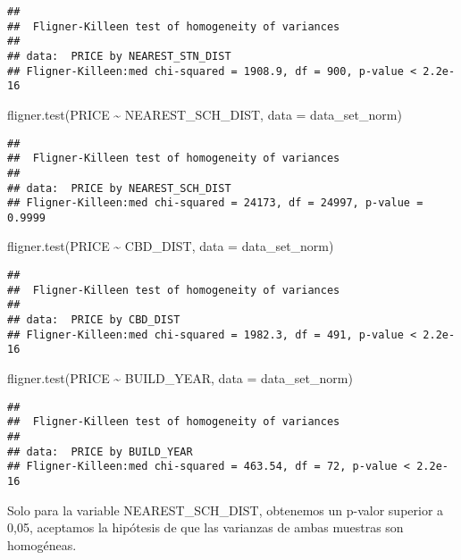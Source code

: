 \documentclass[
]{article}
\newenvironment{Shaded}{\begin{snugshade}}{\end{snugshade}}
\newcommand{\AttributeTok}[1]{\textcolor[rgb]{0.77,0.63,0.00}{#1}}
\newcommand{\FunctionTok}[1]{\textcolor[rgb]{0.00,0.00,0.00}{#1}}
\newcommand{\NormalTok}[1]{#1}
\newcommand{\SpecialCharTok}[1]{\textcolor[rgb]{0.00,0.00,0.00}{#1}}
\begin{document}
\begin{verbatim}
## 
##  Fligner-Killeen test of homogeneity of variances
## 
## data:  PRICE by NEAREST_STN_DIST
## Fligner-Killeen:med chi-squared = 1908.9, df = 900, p-value < 2.2e-16
\end{verbatim}

\begin{Shaded}
\begin{Highlighting}[]
\FunctionTok{fligner.test}\NormalTok{(PRICE }\SpecialCharTok{\textasciitilde{}}\NormalTok{ NEAREST\_SCH\_DIST, }\AttributeTok{data =}\NormalTok{ data\_set\_norm)}
\end{Highlighting}
\end{Shaded}

\begin{verbatim}
## 
##  Fligner-Killeen test of homogeneity of variances
## 
## data:  PRICE by NEAREST_SCH_DIST
## Fligner-Killeen:med chi-squared = 24173, df = 24997, p-value = 0.9999
\end{verbatim}

\begin{Shaded}
\begin{Highlighting}[]
\FunctionTok{fligner.test}\NormalTok{(PRICE }\SpecialCharTok{\textasciitilde{}}\NormalTok{ CBD\_DIST, }\AttributeTok{data =}\NormalTok{ data\_set\_norm)}
\end{Highlighting}
\end{Shaded}

\begin{verbatim}
## 
##  Fligner-Killeen test of homogeneity of variances
## 
## data:  PRICE by CBD_DIST
## Fligner-Killeen:med chi-squared = 1982.3, df = 491, p-value < 2.2e-16
\end{verbatim}

\begin{Shaded}
\begin{Highlighting}[]
\FunctionTok{fligner.test}\NormalTok{(PRICE }\SpecialCharTok{\textasciitilde{}}\NormalTok{ BUILD\_YEAR, }\AttributeTok{data =}\NormalTok{ data\_set\_norm)}
\end{Highlighting}
\end{Shaded}

\begin{verbatim}
## 
##  Fligner-Killeen test of homogeneity of variances
## 
## data:  PRICE by BUILD_YEAR
## Fligner-Killeen:med chi-squared = 463.54, df = 72, p-value < 2.2e-16
\end{verbatim}

Solo para la variable NEAREST\_SCH\_DIST, obtenemos un p-valor superior
a 0,05, aceptamos la hipótesis de que las varianzas de ambas muestras
son homogéneas.
\end{document}
